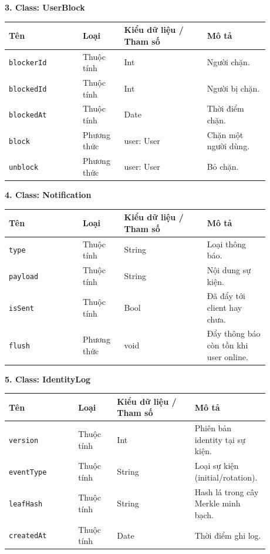 \textbf{3. Class: UserBlock}

{\small
\begin{longtable}{|p{0.25\linewidth}|p{0.14\linewidth}|p{0.28\linewidth}|p{0.21\linewidth}|}
\hline
\textbf{Tên} & \textbf{Loại} & \textbf{Kiểu dữ liệu / Tham số} & \textbf{Mô tả} \\ \hline
\endhead
\texttt{blockerId} & Thuộc tính & Int & Người chặn. \\ \hline
\texttt{blockedId} & Thuộc tính & Int & Người bị chặn. \\ \hline
\texttt{blockedAt} & Thuộc tính & Date & Thời điểm chặn. \\ \hline
\texttt{block} & Phương thức & user: User & Chặn một người dùng. \\ \hline
\texttt{unblock} & Phương thức & user: User & Bỏ chặn. \\ \hline
\end{longtable}
}

\textbf{4. Class: Notification}

{\small
\begin{longtable}{|p{0.25\linewidth}|p{0.14\linewidth}|p{0.28\linewidth}|p{0.21\linewidth}|}
\hline
\textbf{Tên} & \textbf{Loại} & \textbf{Kiểu dữ liệu / Tham số} & \textbf{Mô tả} \\ \hline
\endhead
\texttt{type} & Thuộc tính & String & Loại thông báo. \\ \hline
\texttt{payload} & Thuộc tính & String & Nội dung sự kiện. \\ \hline
\texttt{isSent} & Thuộc tính & Bool & Đã đẩy tới client hay chưa. \\ \hline
\texttt{flush} & Phương thức & void & Đẩy thông báo còn tồn khi user online. \\ \hline
\end{longtable}
}

\textbf{5. Class: IdentityLog}

{\small
\begin{longtable}{|p{0.25\linewidth}|p{0.14\linewidth}|p{0.28\linewidth}|p{0.21\linewidth}|}
\hline
\textbf{Tên} & \textbf{Loại} & \textbf{Kiểu dữ liệu / Tham số} & \textbf{Mô tả} \\ \hline
\endhead
\texttt{version} & Thuộc tính & Int & Phiên bản identity tại sự kiện. \\ \hline
\texttt{eventType} & Thuộc tính & String & Loại sự kiện (initial/rotation). \\ \hline
\texttt{leafHash} & Thuộc tính & String & Hash lá trong cây Merkle minh bạch. \\ \hline
\texttt{createdAt} & Thuộc tính & Date & Thời điểm ghi log. \\ \hline
\end{longtable}
}

